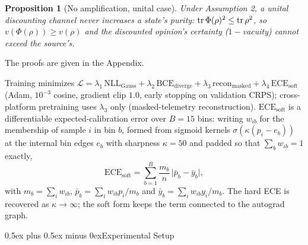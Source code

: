 \documentclass[journal]{IEEEtran}
\makeatletter
\def\section{\@startsection{section}{1}{\z@}{1.8ex plus 1ex minus 0.75ex}%
{0.5ex plus 0.5ex minus 0ex}{\normalfont\normalsize\centering\scshape}}
\newtheorem{proposition}{Proposition}
\makeatother
\begin{document}
\begin{proposition}[No amplification, unital case]\label{thm:contraction}
Under Assumption 2, a unital discounting channel never \emph{increases} a state's purity:
$\tr\Phi(\rho)^2 \le \tr\rho^2$, so $v(\Phi(\rho)) \ge v(\rho)$ and the discounted
opinion's certainty ($1-$vacuity) cannot exceed the source's.
\end{proposition}

The proofs are given in the Appendix.

Training minimizes $\mathcal{L} = \lambda_1\,\mathrm{NLL}_{\mathrm{Gauss}} +
\lambda_2\,\mathrm{BCE}_{\mathrm{diverge}} + \lambda_3\,\mathrm{recon}_{\mathrm{masked}}
+ \lambda_4\,\mathrm{ECE}_{\mathrm{soft}}$ (Adam, $10^{-3}$ cosine, gradient clip
$1.0$, early stopping on validation CRPS); cross-platform pretraining uses
$\lambda_3$ only (masked-telemetry reconstruction).
$\mathrm{ECE}_{\mathrm{soft}}$ is a differentiable expected-calibration error over
$B{=}15$ bins: writing $w_{ib}$ for the membership of sample $i$ in bin $b$, formed
from sigmoid kernels $\sigma(\kappa(p_i - e_b))$ at the internal bin edges $e_b$ with
sharpness $\kappa{=}50$ and padded so that $\sum_b w_{ib}=1$ exactly,
\begin{equation}
\mathrm{ECE}_{\mathrm{soft}} = \sum_{b=1}^{B} \frac{m_b}{n}\,
  \bigl|\bar{p}_b - \bar{y}_b\bigr|,
\end{equation}
with $m_b = \sum_i w_{ib}$, $\bar{p}_b = \sum_i w_{ib}p_i / m_b$ and
$\bar{y}_b = \sum_i w_{ib}y_i / m_b$. The hard ECE is recovered as
$\kappa \to \infty$; the soft form keeps the term connected to the autograd graph.

\section{Experimental Setup}\label{sec:setup}
\end{document}
